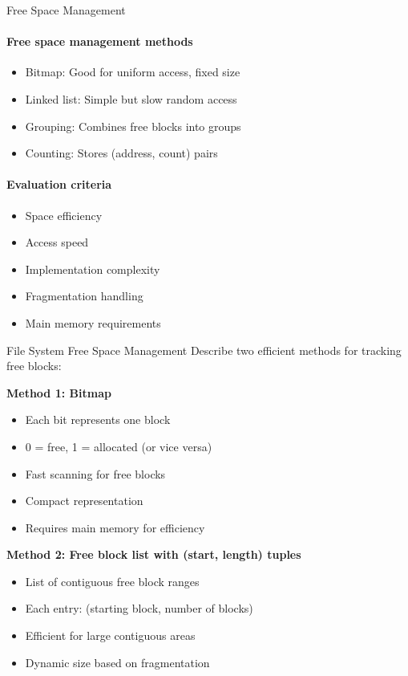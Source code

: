 \begin{KR}{Free Space Management}
    \paragraph{Free space management methods}
    \begin{itemize}
        \item Bitmap: Good for uniform access, fixed size
        \item Linked list: Simple but slow random access
        \item Grouping: Combines free blocks into groups
        \item Counting: Stores (address, count) pairs
    \end{itemize}
    
    \paragraph{Evaluation criteria}
    \begin{itemize}
        \item Space efficiency
        \item Access speed
        \item Implementation complexity
        \item Fragmentation handling
        \item Main memory requirements
    \end{itemize}
\end{KR}

\begin{example2}{File System Free Space Management}
    Describe two efficient methods for tracking free blocks:
    
    \textbf{Method 1: Bitmap}
    \begin{itemize}
        \item Each bit represents one block
        \item 0 = free, 1 = allocated (or vice versa)
        \item Fast scanning for free blocks
        \item Compact representation
        \item Requires main memory for efficiency
    \end{itemize}
    
    \textbf{Method 2: Free block list with (start, length) tuples}
    \begin{itemize}
        \item List of contiguous free block ranges
        \item Each entry: (starting block, number of blocks)
        \item Efficient for large contiguous areas
        \item Dynamic size based on fragmentation
    \end{itemize}
\end{example2}

